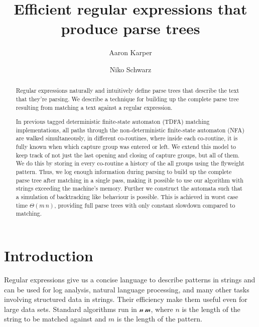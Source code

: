 \documentclass[11pt,a4paper,twoside,openright]{Thesis}
\author{Aaron Karper \and Niko Schwarz}
\theoremstyle{definition}
\begin{document}
\setlength{\pdfpageheight}{\paperheight}
\setlength{\pdfpagewidth}{\paperwidth}

\newcommand{\abs}[1]{\left|#1\right|}

\frenchspacing

\title{Efficient regular expressions that produce parse trees}

\maketitle

\begin{abstract}
Regular expressions naturally and intuitively define parse trees that describe
the text that they're parsing.  We describe a technique for building up the
complete parse tree resulting from matching a text against a regular
expression.

In previous tagged deterministic finite-state automaton (TDFA) matching
implementations, all paths through the non-deterministic finite-state automaton
(NFA) are walked simultaneously, in different co-routines, where inside each
co-routine, it is fully known when which capture group was entered or left. We
extend this model to keep track of not just the last opening and closing of
capture groups, but all of them. We do this by storing in every co-routine a
history of the all groups using the flyweight pattern. Thus, we log enough
information during parsing to build up the complete parse tree after matching
in a single pass, making it possible to use our algorithm with strings
exceeding the machine's memory. Further we construct the automata such that a
simulation of backtracking like behaviour is possible. This is achieved in
worst case time $\Theta(m\,n)$, providing full parse trees with only constant
slowdown compared to matching.
\end{abstract}

\tableofcontents

\chapter{Introduction}

Regular expressions give us a concise language to describe patterns in
strings and can be used for log analysis, natural language processing, and
many other tasks involving structured data in strings. Their efficiency make
them useful even for large data sets. Standard algorithms run in
$\mathcal{n\, m}$, where $n$ is the length of the string to be matched
against and $m$ is the length of the pattern\cite{Sedg90a}.
\end{document}

